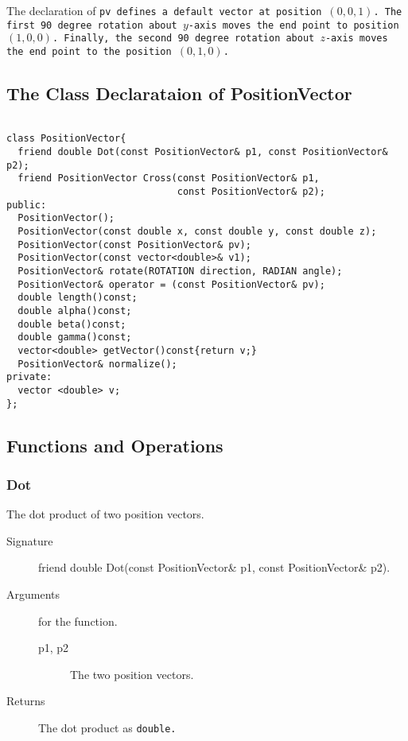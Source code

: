 The declaration of \tt pv \rm defines a default vector at position $(0,0,1)$.
The first 90 degree rotation about $y$-axis moves the end point to position 
$(1,0,0)$. Finally, the second 90 degree rotation about $z$-axis 
moves the end point to the position $(0,1,0)$.
 
\subsection{The Class Declarataion of PositionVector}
\begin{verbatim}
 
class PositionVector{
  friend double Dot(const PositionVector& p1, const PositionVector& p2);
  friend PositionVector Cross(const PositionVector& p1, 
                              const PositionVector& p2);  
public:
  PositionVector();
  PositionVector(const double x, const double y, const double z);
  PositionVector(const PositionVector& pv);
  PositionVector(const vector<double>& v1);
  PositionVector& rotate(ROTATION direction, RADIAN angle);
  PositionVector& operator = (const PositionVector& pv);
  double length()const;
  double alpha()const;
  double beta()const;
  double gamma()const;
  vector<double> getVector()const{return v;}
  PositionVector& normalize(); 
private:
  vector <double> v;
};
\end{verbatim}

\subsection{Functions and Operations}
\subsubsection{Dot}
The  dot product of two position vectors.
\begin{description}
  \item[Signature] friend double Dot(const PositionVector\& p1, const
  PositionVector\& p2).
  \item[Arguments] for the function.
    \begin{description}
      \item[p1, p2] The two position vectors.
    \end{description}
  \item[Returns] The dot product as \tt double\rm.
\end{description}

